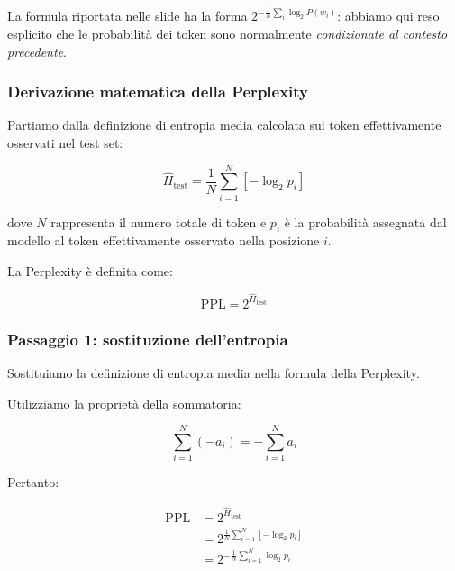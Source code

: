 La formula riportata nelle slide ha la forma $2^{-\frac1N\sum_i\log_2 P(w_i)}$: abbiamo qui reso esplicito che le probabilità dei token sono normalmente \emph{condizionate al contesto precedente}.


\subsubsection{Derivazione matematica della Perplexity}

Partiamo dalla definizione di entropia media calcolata sui token
effettivamente osservati nel test set:

\begin{equation}
    \hat{H}_{\text{test}}
    = \frac{1}{N}\sum_{i=1}^{N}[-\log_2 p_i]
\end{equation}

dove $N$ rappresenta il numero totale di token e $p_i$ è
la probabilità assegnata dal modello al token effettivamente
osservato nella posizione $i$.

La Perplexity è definita come:

\begin{equation}
    \mathrm{PPL} = 2^{\hat{H}_{\text{test}}}
\end{equation}

\subsubsection*{Passaggio 1: sostituzione dell'entropia}

Sostituiamo la definizione di entropia media nella formula
della Perplexity.

Utilizziamo la proprietà della sommatoria:

\begin{equation}
    \boxed{
        \sum_{i=1}^{N}(-a_i)
        = -\sum_{i=1}^{N}a_i
    }
\end{equation}

Pertanto:

\begin{equation}
    \begin{aligned}
        \mathrm{PPL}
        &= 2^{\hat{H}_{\text{test}}}\\[6pt]
        &= 2^{\frac{1}{N}
            \sum_{i=1}^{N}[-\log_2 p_i]}\\[6pt]
        &= 2^{-\frac{1}{N}
            \sum_{i=1}^{N}\log_2 p_i}
    \end{aligned}
\end{equation}

